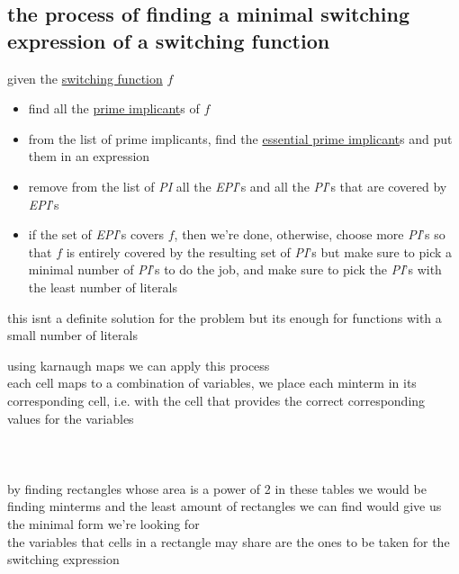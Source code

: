 \documentclass[a4paper,12pt]{article}
\begin{document}
\subsection{the process of finding a minimal switching expression of a switching function}
\label{sec:org6111edb}
given the \hyperref[sec:org4e6eeb6]{switching function} \(f\)\\
\begin{itemize}
\item find all the \hyperref[sec:org2137fb0]{prime implicant}s of \(f\)\\
\item from the list of prime implicants, find the \hyperref[sec:org5d4f600]{essential prime implicant}s and put them in an expression\\
\item remove from the list of \emph{PI} all the \emph{EPI}'s and all the \emph{PI}'s that are covered by \emph{EPI}'s\\
\item if the set of \emph{EPI}'s covers \(f\), then we're done, otherwise, choose more \emph{PI}'s so that \(f\) is entirely covered by the resulting set of \emph{PI}'s but make sure to pick a minimal number of \emph{PI}'s to do the job, and make sure to pick the \emph{PI}'s with the least number of literals\\
\end{itemize}
\begin{note}
this isnt a definite solution for the problem but its enough for functions with a small number of literals\\
\end{note}
using karnaugh maps we can apply this process\\
each cell maps to a combination of variables, we place each minterm in its corresponding cell, i.e. with the cell that provides the correct corresponding values for the variables\\
\\

\\

\\

by finding rectangles whose area is a power of 2 in these tables we would be finding minterms and the least amount of rectangles we can find would give us the minimal form we're looking for\\
the variables that cells in a rectangle may share are the ones to be taken for the switching expression\\
\end{document}
